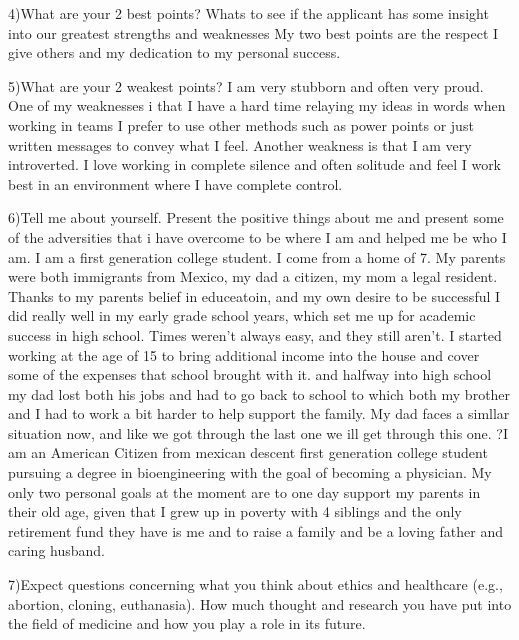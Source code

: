 \documentclass[12pt,a4paper,article]{memoir} %
\begin{document}
4)What are your 2 best points? Whats to see if the applicant has some insight into our greatest strengths and weaknesses
My two best points are the respect I give others and my dedication to my personal success.

5)What are your 2 weakest points?
I am very stubborn and often very proud.  
One of my weaknesses i that I have a hard time relaying my ideas in words when working in teams I prefer to use other methods such as power points or just written messages to convey what I feel.  Another weakness is that I am very introverted.  I love working in complete silence and often solitude and feel I work best in an environment where I have complete control.

6)Tell me about yourself. Present the positive things about me and present some of the adversities that i have overcome to be where I am and helped me be who I am.
I am a first generation college student. I come from a home of 7. My parents were both immigrants from Mexico, my dad a citizen, my mom a legal resident.  Thanks to my parents belief in educeatoin, and my own desire to be successful I did really well in my early grade school years, which set me up for academic success in high school.  Times weren't always easy, and they still aren't. I started working at the age of 15 to bring additional income into the house and cover some of the expenses that school brought with it.  and halfway into high school my dad lost both his jobs and had to go back to school to which both my brother and I had to work a bit harder to help support the family.  My dad faces a simllar situation now, and like we got through the last one we ill get through this one. ?I am an American Citizen from mexican descent first generation college student pursuing a degree in bioengineering with the goal of becoming a physician.  My only two personal goals at the moment are to one day support my parents in their old age, given that I grew up in poverty with 4 siblings and the only retirement fund they have is me and to raise a family and be a loving father and caring husband. 

7)Expect questions concerning what you think about ethics and healthcare (e.g., abortion, cloning, euthanasia). How much thought and research you have put into the field of medicine and how you play a role in its future.


\end{document}
